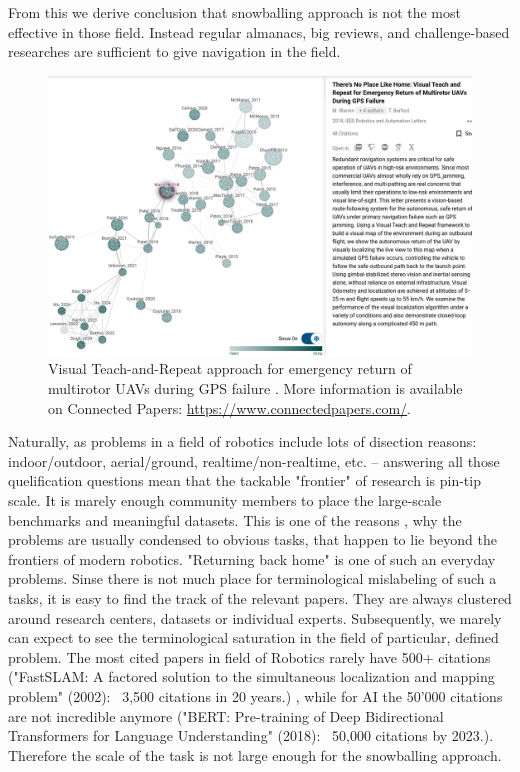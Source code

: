 \documentclass[runningheads]{llncs}
\begin{document}
From this we derive conclusion that snowballing approach is not the most effective in those field. Instead regular almanacs, big reviews, and challenge-based researches are sufficient to give navigation in the field.

\begin{figure}[ht]
  \centering
  \includegraphics[width=\linewidth]{img/There_is_no_place_like_home_research_tree.png}
  \caption{Visual Teach-and-Repeat approach for emergency return of multirotor UAVs during GPS failure \cite{warren-ral19-no-place-like-Home}. More information is available on Connected Papers: \protect\url{https://www.connectedpapers.com/}.}
  \label{fig:no_place_like_home}
\end{figure}

Naturally, as problems in a field of robotics include lots of disection reasons: indoor/outdoor, aerial/ground, realtime/non-realtime, etc. -- answering all those quelification questions mean that the tackable "frontier" of research is pin-tip scale. It is marely enough community members to place the large-scale benchmarks and meaningful datasets. This is one of the reasons , why the problems are usually condensed to obvious tasks, that happen to lie beyond the frontiers of modern robotics. "Returning back home" is one of such an everyday problems.
Sinse there is not much place for terminological mislabeling of such a tasks,  it is easy to find the track of the relevant papers. They are always clustered around research centers, datasets or individual experts. Subsequently, we marely can expect to see the terminological saturation in the field of particular, defined problem. The most cited papers in field of Robotics rarely have 500+ citations ("FastSLAM: A factored solution to the simultaneous localization and mapping problem" (2002): ~3,500 citations in 20 years.) , while for AI the 50'000 citations are not incredible anymore ("BERT: Pre-training of Deep Bidirectional Transformers for Language Understanding" (2018): ~50,000 citations by 2023.). Therefore the scale of the task is not large enough for the snowballing approach.
\end{document}

